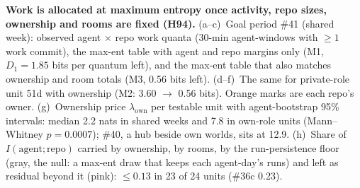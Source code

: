 \caption{\textbf{Work is allocated at maximum entropy once activity, repo sizes, ownership and rooms are fixed (H94).}
(a--c)~Goal period \#41 (shared week): observed agent $\times$ repo work quanta (30-min agent-windows with $\ge1$ work commit), the max-ent table with agent and repo margins only (M1, $D_1=1.85$ bits per quantum left), and the max-ent table that also matches ownership and room totals (M3, 0.56 bits left). (d--f)~The same for private-role unit 51d with ownership (M2: 3.60 $\to$ 0.56 bits). Orange marks are each repo's owner.
(g)~Ownership price $\lambda_\mathrm{own}$ per testable unit with agent-bootstrap 95\% intervals: median 2.2 nats in shared weeks and 7.8 in own-role units (Mann--Whitney $p=0.0007$); \#40, a hub beside own worlds, sits at 12.9.
(h)~Share of $I(\mathrm{agent};\mathrm{repo})$ carried by ownership, by rooms, by the run-persistence floor (gray, the null: a max-ent draw that keeps each agent-day's runs) and left as residual beyond it (pink): $\le0.13$ in 23 of 24 units (\#36c 0.23).}
\label{fig:H94}
